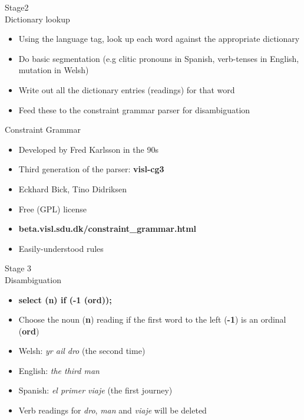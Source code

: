 \documentclass[hyperref={pdfpagelabels=false}, 14pt]{beamer}
\begin{document}
\begin{frame}{Stage2 \\ Dictionary lookup}
\begin{itemize}
\item Using the language tag, look up each word against the appropriate dictionary
\item Do basic segmentation (e.g clitic pronouns in Spanish, verb-tenses in English, mutation in Welsh)
\item Write out all the dictionary entries (readings) for that word
\item Feed these to the constraint grammar parser for disambiguation
\end{itemize}
\end{frame}


\begin{frame}{Constraint Grammar}
\begin{itemize}
\item Developed by Fred Karlsson in the 90s
\item Third generation of the parser: \textbf{visl-cg3}
\item Eckhard Bick, Tino Didriksen
\item Free (GPL) license
\item \textbf{beta.visl.sdu.dk/constraint\_grammar.html}
\item Easily-understood rules
\end{itemize}
\end{frame}


\begin{frame}{Stage 3 \\ Disambiguation}
\begin{itemize}
\item \begin{large}\textbf{select (n) if (-1 (ord));} \end{large}
\item Choose the noun (\textbf{n}) reading if the first word to the left (\textbf{-1}) is an ordinal (\textbf{ord})
\item Welsh: \textit{yr ail dro} (the second time)
\item English: \textit{the third man}
\item Spanish: \textit{el primer viaje} (the first journey)
\item Verb readings for \textit{dro}, \textit{man} and \textit{viaje} will be deleted
% 
\end{itemize}
\end{frame}
\end{document}
